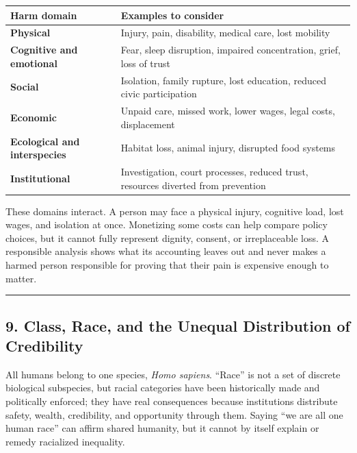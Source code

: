 \documentclass[
  11pt,
  letterpaper,
]{article}
\newcounter{none} %
\begin{document}
{\def\LTcaptype{none} %
\begin{longtable}[]{@{}
  >{\raggedright\arraybackslash}p{}
  >{\raggedright\arraybackslash}p{}@{}}
\toprule\noalign{}
\begin{minipage}[b]{\linewidth}\raggedright
Harm domain
\end{minipage} & \begin{minipage}[b]{\linewidth}\raggedright
Examples to consider
\end{minipage} \\
\midrule\noalign{}
\endhead
\bottomrule\noalign{}
\endlastfoot
\textbf{Physical} & Injury, pain, disability, medical care, lost
mobility \\
\textbf{Cognitive and emotional} & Fear, sleep disruption, impaired
concentration, grief, loss of trust \\
\textbf{Social} & Isolation, family rupture, lost education, reduced
civic participation \\
\textbf{Economic} & Unpaid care, missed work, lower wages, legal costs,
displacement \\
\textbf{Ecological and interspecies} & Habitat loss, animal injury,
disrupted food systems \\
\textbf{Institutional} & Investigation, court processes, reduced trust,
resources diverted from prevention \\
\end{longtable}
}

These domains interact. A person may face a physical injury, cognitive
load, lost wages, and isolation at once. Monetizing some costs can help
compare policy choices, but it cannot fully represent dignity, consent,
or irreplaceable loss. A responsible analysis shows what its accounting
leaves out and never makes a harmed person responsible for proving that
their pain is expensive enough to matter.

\begin{center}\rule{0.5\linewidth}{0.5pt}\end{center}

\subsection{9. Class, Race, and the Unequal Distribution of
Credibility}\label{class-race-and-the-unequal-distribution-of-credibility}

All humans belong to one species, \emph{Homo sapiens}. ``Race'' is not a
set of discrete biological subspecies, but racial categories have been
historically made and politically enforced; they have real consequences
because institutions distribute safety, wealth, credibility, and
opportunity through them. Saying ``we are all one human race'' can
affirm shared humanity, but it cannot by itself explain or remedy
racialized inequality.
\end{document}
